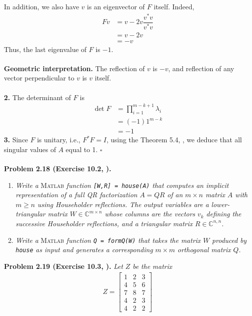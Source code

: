 \documentclass[a4paper,oneside]{book}
\numberwithin{equation}{chapter}
\begin{document}
In addition, we also have $v$ is an eigenvector of $F$ itself. Indeed,
\begin{align}
Fv &= v - 2v\dfrac{{{v^*}v}}{{{v^*}v}}\\
&= v - 2v\\
 &=  - v
\end{align}
Thus, the last eigenvalue of $F$ is $-1$.\\
\\
\textbf{Geometric interpretation.} The reflection of $v$ is $-v$, and reflection of any vector perpendicular to $v$ is $v$ itself.\\
\\
\textbf{2.} The determinant of $F$ is 
\begin{align}
\det F &= \prod\limits_{i = 1}^{m - k + 1} {{\lambda _i}} \\
& = \left( { - 1} \right){1^{m - k}}\\
& =  - 1
\end{align}
\textbf{3.} Since $F$ is unitary, i.e., $F^*F=I$, using the Theorem 5.4, \cite{1}, we deduce that all singular values of $A$ equal to 1. \hfill $\square$\\
\\
\textbf{Problem 2.18 (Exercise 10.2, \cite{1}).} 
\begin{enumerate}
\item \textit{Write a}\textsc{ Matlab}\textit{ function \texttt{[W,R] = house(A)} that computes an implicit representation of a full QR factorization $A=QR$ of an $m\times n$ matrix $A$ with $m\ge n$ using Householder reflections. The output variables are a lower-triangular matrix $W\in \mathbb{C}^{m\times n}$ whose columns are the vectors $v_k$ defining the successive Householder reflections, and a triangular matrix $R\in \mathbb{C}^{n,n}$.}
\item \textit{Write a}\textsc{ Matlab}\textit{ function \texttt{Q = formQ(W)} that takes the matrix $W$ produced by \texttt{house} as input and generates a corresponding $m\times m$ orthogonal matrix $Q$.}
\end{enumerate}
\textbf{Problem 2.19 (Exercise 10.3, \cite{1}).} \textit{Let $Z$ be the matrix}
\begin{align}
Z = \left[ {\begin{array}{*{20}{c}}
1&2&3\\
4&5&6\\
7&8&7\\
4&2&3\\
4&2&2
\end{array}} \right]
\end{align}
\end{document}
